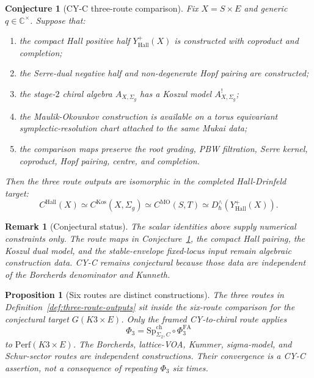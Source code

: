 \documentclass[11pt]{article}
\newtheorem{proposition}[theorem]{Proposition}
\newtheorem{conjecture}[theorem]{Conjecture}
\newtheorem{remark}[theorem]{Remark}
\providecommand{\Perf}{\mathrm{Perf}}
\providecommand{\CC}{\mathbb{C}}
\begin{document}
\begin{conjecture}[CY-C three-route comparison]
\label{conj:cy-c-three-route-comparison}
Fix $X=S\times E$ and generic $q\in\CC^\times$. Suppose that:
\begin{enumerate}[label=\textup{(C\arabic*)}, leftmargin=2.2em]
\item the compact Hall positive half $Y^+_{\mathrm{Hall}}(X)$ is
constructed with coproduct and completion;
\item the Serre-dual negative half and non-degenerate Hopf pairing are
constructed;
\item the stage-$2$ chiral algebra $A_{X,\Sigma_g}$ has a Koszul model
$A_{X,\Sigma_g}^{!}$;
\item the Maulik-Okounkov construction is available on a torus
equivariant symplectic-resolution chart attached to the same Mukai
data;
\item the comparison maps preserve the root grading, PBW filtration,
Serre kernel, coproduct, Hopf pairing, centre, and completion.
\end{enumerate}
Then the three route outputs are isomorphic in the completed
Hall-Drinfeld target:
\[
 C^{\mathrm{Hall}}(X)
 \simeq
 C^{\mathrm{Kos}}(X,\Sigma_g)
 \simeq
 C^{\mathrm{MO}}(S,T)
 \simeq
 D_\hbar^\wedge(Y^+_{\mathrm{Hall}}(X)).
\]
\end{conjecture}

\begin{remark}[Conjectural status]
\label{rem:why-conjecture}
The scalar identities above supply numerical constraints only. The
route maps in Conjecture~\ref{conj:cy-c-three-route-comparison}, the
compact Hall pairing, the Koszul dual model, and the stable-envelope
fixed-locus input remain algebraic construction data. CY-C remains
conjectural because those data are independent of the Borcherds
denominator and Kunneth.
\end{remark}

\begin{proposition}[Six routes are distinct constructions]
\label{prop:six-routes-distinct}
The three routes in Definition~\ref{def:three-route-outputs} sit inside
the six-route comparison for the conjectural target $G(K3\times E)$.
Only the framed CY-to-chiral route applies
\[
 \Phi_3=\mathrm{Sp}^{\mathrm{ch}}_{\Sigma_2,C}\circ\Phi_3^{\mathrm{FA}}
\]
to $\Perf(K3\times E)$. The Borcherds, lattice-VOA, Kummer,
sigma-model, and Schur-sector routes are independent constructions.
Their convergence is a CY-C assertion, not a consequence of repeating
$\Phi_3$ six times.
\end{proposition}
\end{document}
